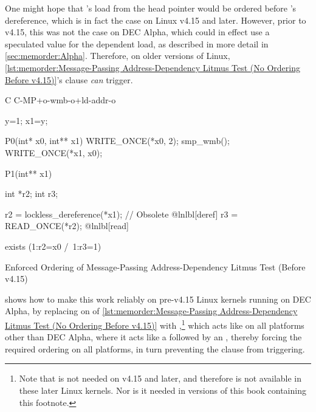 \begin{fcvref}
One might hope that 's load from the head pointer would be ordered
before 's dereference, which is in fact the case on Linux v4.15
and later.
However, prior to v4.15, this was not the case on DEC Alpha, which could
in effect use a speculated value for the dependent load, as described
in more detail in \cref{sec:memorder:Alpha}.
Therefore, on older versions of Linux,
\cref{lst:memorder:Message-Passing Address-Dependency Litmus Test (No Ordering Before v4.15)}'s
 clause \emph{can} trigger.
\end{fcvref}

\begin{listing}
\begin{fcvlabel}
\begin{VerbatimL}[commandchars=\@\[\]]
C C-MP+o-wmb-o+ld-addr-o

{
y=1;
x1=y;
}

P0(int* x0, int** x1) {
	WRITE_ONCE(*x0, 2);
	smp_wmb();
	WRITE_ONCE(*x1, x0);
}

P1(int** x1) {
	int *r2;
	int r3;

	r2 = lockless_dereference(*x1); // Obsolete @lnlbl[deref]
	r3 = READ_ONCE(*r2);			    @lnlbl[read]
}

exists (1:r2=x0 /\ 1:r3=1)
\end{VerbatimL}
\end{fcvlabel}
\caption{Enforced Ordering of Message-Passing Address-Dependency Litmus Test (Before v4.15)}
\label{lst:memorder:Enforced Ordering of Message-Passing Address-Dependency Litmus Test (Before v4.15)}
\end{listing}

\begin{fcvref}
shows how to make this work reliably on pre-v4.15 Linux kernels running on
DEC Alpha, by replacing  on  of
\cref{lst:memorder:Message-Passing Address-Dependency Litmus Test (No Ordering Before v4.15)}
with ,\footnote{
	Note that  is not needed on v4.15 and
	later, and therefore is not available in these later Linux kernels.
	Nor is it needed in versions of this book containing this footnote.}
which acts like  on all platforms other than DEC Alpha,
where it acts like a  followed by an ,
thereby forcing the required ordering on all platforms, in turn
preventing the  clause from triggering.
\end{fcvref}

